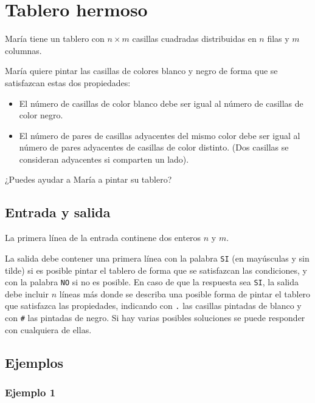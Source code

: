 \documentclass[10.5pt]{article}
\begin{document}
\section*{Tablero hermoso}

Mar\'ia tiene un tablero con $n \times m$ casillas cuadradas distribuidas en $n$ filas y $m$ columnas.

Mar\'ia quiere pintar las casillas de colores blanco y negro de forma que se satisfazcan estas dos propiedades:

\begin{itemize}

\item El n\'umero de casillas de color blanco debe ser igual al n\'umero de casillas de color negro.
\item El n\'umero de pares de casillas adyacentes del mismo color debe ser igual al n\'umero de pares adyacentes de casillas de color distinto. (Dos casillas se consideran adyacentes si comparten un lado).

\end{itemize}

¿Puedes ayudar a Mar\'ia a pintar su tablero?


\subsection*{Entrada y salida}

La primera l\'inea de la entrada continene dos enteros $n$ y $m$. 

La salida debe contener una primera l\'inea con la palabra \texttt{SI} (en may\'usculas y sin tilde) si es posible pintar el tablero de forma que se satisfazcan las condiciones, y con la palabra \texttt{NO} si no es posible. En caso de que la respuesta sea \texttt{SI}, la salida debe incluir $n$ l\'ineas m\'as donde se describa una posible forma de pintar el tablero que satisfazca las propiedades, indicando con \texttt{.} las casillas pintadas de blanco y con \texttt{\#} las pintadas de negro. Si hay varias posibles soluciones se puede responder con cualquiera de ellas.

\subsection*{Ejemplos}
\subsubsection*{Ejemplo 1}
\end{document}
